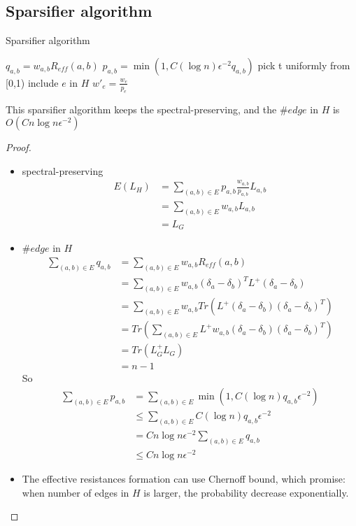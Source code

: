 \subsection{Sparsifier algorithm}
\begin{algorithm}[H]
\caption{Sparsifier algorithm}
\begin{algorithmic}[1]
\STATE $q_{a,b}=w_{a,b}R_{eff}(a,b)$
\STATE $p_{a,b}=\min(1,C(\log n)\epsilon^{-2}q_{a,b})$
    \STATE pick t uniformly from [0,1)
        \STATE include $e$ in $H$
        \STATE $w'_e =\frac{w_{e}}{p_e}$
     \ENDIF
\ENDFOR
\end{algorithmic}
\end{algorithm}
This sparsifier algorithm keeps the spectral-preserving, and the $\#edge$ in $H$ is $O(C n\log n\epsilon^{-2})$ 
\begin{proof} 

\begin{itemize}
    \item spectral-preserving
    \begin{equation*}
        \begin{aligned}
            E(L_H)&=\sum_{(a,b)\in E}p_{a,b}\frac{w_{a,b}}{p_{a,b}}L_{a,b}\\
            &=\sum_{(a,b)\in E}w_{a,b}L_{a,b} \\
            &=L_G
        \end{aligned}
    \end{equation*}
    \item $\#edge$ in $H$
     \begin{equation*}
        \begin{aligned}
           \sum_{(a,b)\in E}q_{a,b}&=\sum_{(a,b)\in E}w_{a,b}R_{eff}(a,b)\\
           &=\sum_{(a,b)\in E}w_{a,b}(\delta_a-\delta_b)^TL^+(\delta_a -\delta_b)\\
           &=\sum_{(a,b)\in E}w_{a,b}Tr(L^+(\delta_a-\delta_b)(\delta_a -\delta_b)^T)\\
           &=Tr(\sum_{(a,b)\in E}L^+w_{a,b}(\delta_a-\delta_b)(\delta_a -\delta_b)^T) \\
           &=Tr(L_G^+L_G)\\
           &=n-1
        \end{aligned}
    \end{equation*}
    So 
    \begin{equation*}
        \begin{aligned}
           \sum_{(a,b)\in E}p_{a,b}&=\sum_{(a,b)\in E}\min(1,C(\log n)q_{a,b}\epsilon^{-2})\\
           &\le \sum_{(a,b)\in E}C(\log n)q_{a,b}\epsilon^{-2}\\
            &= Cn \log n \epsilon^{-2} \sum_{(a,b)\in E}q_{a,b}\\
             &\le Cn \log n\epsilon^{-2}
        \end{aligned}
    \end{equation*}
    \item The effective resistances formation can use Chernoff bound, which promise: when number of edges in $H$ is larger, the probability decrease exponentially.

\end{itemize}
\end{proof}
